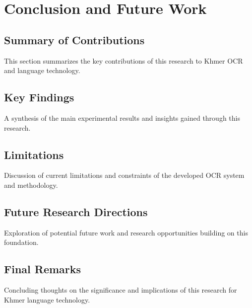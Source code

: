\chapter{Conclusion and Future Work}
\label{ch:conclusion}

\section{Summary of Contributions}
\label{sec:contributions}
This section summarizes the key contributions of this research to Khmer OCR and language technology.

\section{Key Findings}
\label{sec:findings}
A synthesis of the main experimental results and insights gained through this research.

\section{Limitations}
\label{sec:final-limitations}
Discussion of current limitations and constraints of the developed OCR system and methodology.

\section{Future Research Directions}
\label{sec:future}
Exploration of potential future work and research opportunities building on this foundation.

\section{Final Remarks}
\label{sec:remarks}
Concluding thoughts on the significance and implications of this research for Khmer language technology.
